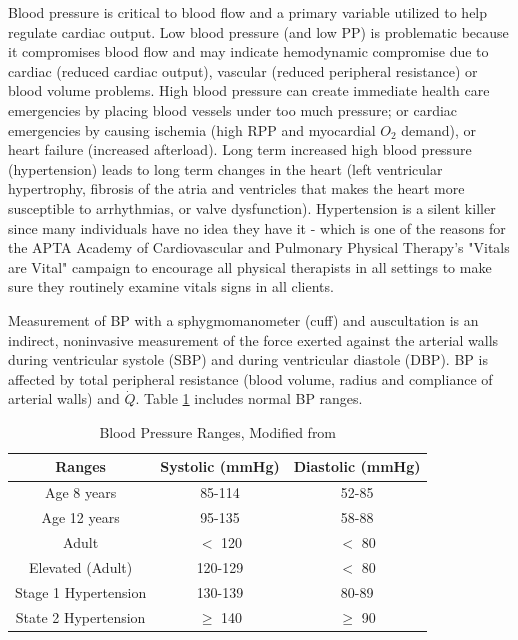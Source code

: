 Blood pressure is critical to blood flow and a primary variable utilized to help regulate cardiac output. Low blood pressure (and low PP) is problematic because it compromises blood flow and may indicate hemodynamic compromise due to cardiac (reduced cardiac output), vascular (reduced peripheral resistance) or blood volume problems. High blood pressure can create immediate health care emergencies by placing blood vessels under too much pressure; or cardiac emergencies by causing ischemia (high RPP and myocardial $O_2$ demand), or heart failure (increased afterload). Long term increased high blood pressure (hypertension) leads to long term changes in the heart (left ventricular hypertrophy, fibrosis of the atria and ventricles that makes the heart more susceptible to arrhythmias, or valve dysfunction). Hypertension is a silent killer since many individuals have no idea they have it - which is one of the reasons for the APTA Academy of Cardiovascular and Pulmonary Physical Therapy's "Vitals are Vital" campaign to encourage all physical therapists in all settings to make sure they routinely examine vitals signs in all clients.

Measurement of BP with a sphygmomanometer (cuff) and auscultation is an indirect, noninvasive measurement of the force exerted against the arterial walls during ventricular systole (SBP) and during ventricular diastole (DBP). BP is affected by total peripheral resistance (blood volume, radius and compliance of arterial walls) and $\dot{Q}$. Table \ref{table:BP_Ranges} includes normal BP ranges. 

\begin{table}[h!]
\centering
\begin{tabular}{||c c c ||} 
 \hline
 Ranges & Systolic (mmHg) & Diastolic (mmHg) \\ [0.5ex] 
 \hline\hline
Age 8 years & 85-114  & 52-85  \\ 
Age 12 years & 95-135  & 58-88   \\
Adult & $<$ 120   & $<$ 80   \\
Elevated (Adult) & 120-129   & $<$ 80  \\
Stage 1 Hypertension & 130-139  & 80-89   \\
State 2 Hypertension & $\geq$ 140 &  $\geq$ 90 \\ [1ex] 
 \hline
\end{tabular}
\caption{Blood Pressure Ranges, Modified from \cite{collins_cardiac_2019}}
\label{table:BP_Ranges}
\end{table}

